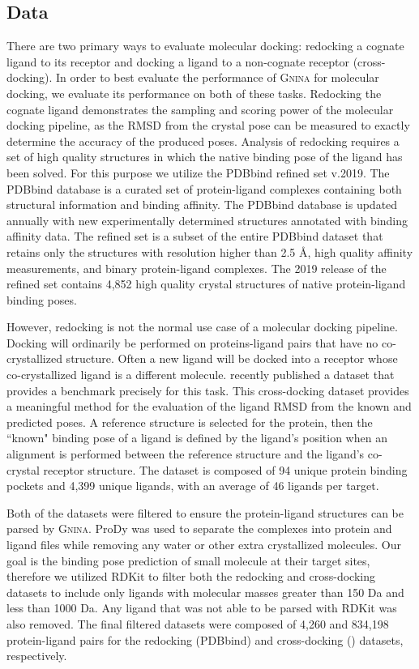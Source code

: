 \documentclass[journal=jcisd8,manuscript=article]{achemso}
\begin{document}
\subsection{Data}
There are two primary ways to evaluate molecular docking: redocking a cognate ligand to its receptor and docking a ligand to a non-cognate receptor (cross-docking). In order to best evaluate the performance of \textsc{Gnina} for molecular docking, we evaluate its performance on both of these tasks. Redocking the cognate ligand demonstrates the sampling and scoring power of the molecular docking pipeline, as the RMSD from the crystal pose can be measured to exactly determine the accuracy of the produced poses. Analysis of redocking requires a set of high quality structures in which the native binding pose of the ligand has been solved. For this purpose we utilize the PDBbind refined set v.2019\cite{liu2017forging}. The PDBbind database is a curated set of protein-ligand complexes containing both structural information and binding affinity. The PDBbind database is updated annually with new experimentally determined structures annotated with binding affinity data. The refined set is a subset of the entire PDBbind dataset that retains only the structures with resolution higher than 2.5 \AA, high quality affinity measurements, and binary protein-ligand complexes. The 2019 release of the refined set contains 4,852 high quality crystal structures of native protein-ligand binding poses. 

However, redocking is not the normal use case of a molecular docking pipeline. Docking will ordinarily be performed on proteins-ligand pairs that have no co-crystallized structure. Often a new ligand will be docked into a receptor whose co-crystallized ligand is a different molecule. \citet{wierbowski2020cross} recently published a dataset that provides a benchmark precisely for this task. This cross-docking dataset provides a meaningful method for the evaluation of the ligand RMSD from the known and predicted poses. A reference structure is selected for the protein, then the ``known" binding pose of a ligand is defined by the ligand's position when an alignment is performed between the reference structure and the ligand's co-crystal receptor structure. The dataset is composed of 94 unique protein binding pockets and 4,399 unique ligands, with an average of 46 ligands per target.

Both of the datasets were filtered to ensure the protein-ligand structures can be parsed by \textsc{Gnina}. ProDy\cite{bakan2011prody} was used to separate the complexes into protein and ligand files while removing any water or other extra crystallized molecules. Our goal is the binding pose prediction of small molecule at their target sites, therefore we utilized RDKit\cite{rdkit} to filter both the redocking and cross-docking datasets to include only ligands with molecular masses greater than 150 Da and less than 1000 Da. Any ligand that was not able to be parsed with RDKit was also removed. The final filtered datasets were composed of 4,260 and 834,198 protein-ligand pairs for the redocking (PDBbind) and cross-docking (\citet{wierbowski2020cross}) datasets, respectively.
\end{document}
